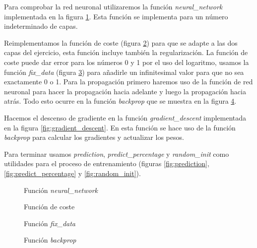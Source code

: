 \documentclass[6pt]{AiTex}
\begin{document}
Para comprobar la red neuronal utilizaremos la función \textit{neural\_network} implementada en la figura \ref{fig:neural_network}. Esta función se implementa para un número indeterminado de capas.

Reimplementamos la función de coste (figura \ref{cost}) para que se adapte a las dos capas del ejercicio, esta función incluye también la regularización. La función de coste puede dar error para los números 0 y 1 por el uso del logaritmo, usamos la función \textit{fix\_data} (figura \ref{fig:fix_data}) para añadirle un infinitesimal valor para que no sea exactamente 0 o 1. Para la propagación primero haremos uso de la función de red neuronal para hacer la propagación hacia adelante y luego la propagación hacia atrás. Todo esto ocurre en la función \textit{backprop} que se muestra en la figura \ref{fig:backprop}.

Hacemos el descenso de gradiente en la función \textit{gradient\_descent} implementada en la figura \ref{fig:gradient_descent}. En esta función se hace uso de la función \textit{backprop} para calcular los gradientes y actualizar los pesos.

Para terminar usamos \textit{prediction}, \textit{predict\_percentage} y \textit{random\_init} como utilidades para el proceso de entrenamiento (figuras \ref{fig:prediction}, \ref{fig:predict_percentage} y \ref{fig:random_init}).

\begin{figure}[H]
    \centering
    
    \caption{Función \textit{neural\_network}}
    \label{fig:neural_network}
\end{figure}

\begin{figure}[H]
    \centering
    
    \caption{Función de coste}
    \label{cost}
\end{figure}

\begin{figure}[H]
    \centering
    
    \caption{Función \textit{fix\_data}}
    \label{fig:fix_data}
\end{figure}

\begin{figure}[H]
    \centering
    
    \caption{Función \textit{backprop}}
    \label{fig:backprop}
\end{figure}
\end{document}
